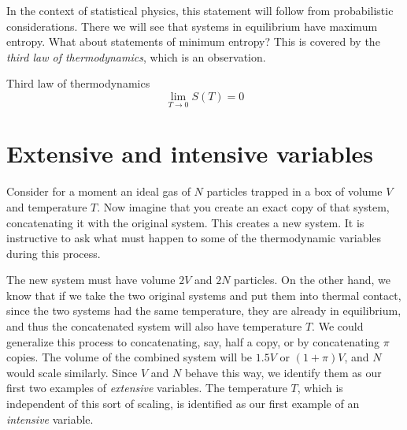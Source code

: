 In the context of statistical physics, this statement will follow from
probabilistic considerations. There we will see that systems in equilibrium have
maximum entropy. What about statements of minimum entropy? This is covered by
the {\it third law of thermodynamics}, which is an observation.
\begin{theorem}{Third law of thermodynamics}{}
$$
  \lim_{T\to0}S(T)=0
$$
\end{theorem}



\section{Extensive and intensive variables}\label{sec:intensiveextensive}

Consider for a moment an ideal gas of $N$ particles trapped in a box of volume
$V$ and temperature $T$. Now imagine that you create an exact copy of that system, 
concatenating it with the original system. This creates a new system. 
It is instructive to ask what must happen to some of the thermodynamic variables
during this process.

The new system must have volume $2V$ and $2N$ particles. On the other hand, we
know that if we take the two original systems and put them into thermal contact,
since the two systems had the same temperature, they are already in equilibrium,
and thus the concatenated system will also have temperature $T$. We could
generalize this process to concatenating, say, half a copy, or by concatenating
$\pi$ copies. The volume of the combined system will be $1.5V$ or $(1+\pi)V$,
and $N$ would scale similarly. Since $V$ and $N$ behave this way, we identify
them as our first two examples of {\it extensive} variables.
The temperature $T$, which is independent of this sort of scaling, is identified
as our first example of an {\it intensive} variable.

